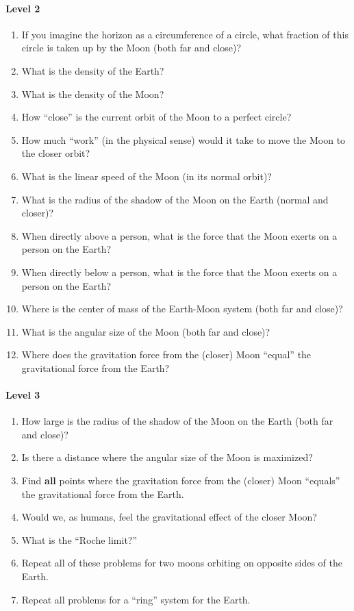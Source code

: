 \documentclass{ximera}
\begin{document}
\begin{problem}
\begin{freeResponse}
  \paragraph{Level 2}
  \begin{enumerate}
  \item If you imagine the horizon as a circumference of a circle, what
    fraction of this circle is taken up by the Moon (both far and
    close)?
  \item What is the density of the Earth?
  \item What is the density of the Moon?
  \item How ``close'' is the current orbit of the Moon to a perfect circle?
  \item How much ``work'' (in the physical sense) would it take to
    move the Moon to the closer orbit?
  \item What is the linear speed of the Moon (in its normal orbit)?
  \item What is the radius of the shadow of the Moon on the Earth
    (normal and closer)?
  \item When directly above a person, what is the force that the Moon
    exerts on a person on the Earth?
  \item When directly below a person, what is the force that the Moon
    exerts on a person on the Earth?
  \item Where is the center of mass of the Earth-Moon system (both far
    and close)?
  \item What is the angular size of the Moon (both far and close)?
  \item Where does the gravitation force from the (closer) Moon
    ``equal'' the gravitational force from the Earth?
  \end{enumerate}
  
  \paragraph{Level 3}
  \begin{enumerate}
  \item How large is the radius of the shadow of the Moon on the Earth
    (both far and close)?
  \item Is there a distance where the angular size of the Moon is maximized?
  \item Find \textbf{all} points where the gravitation force from the (closer)
    Moon ``equals'' the gravitational force from the Earth.
  \item Would we, as humans, feel the gravitational effect of the closer
    Moon?
  \item What is the ``Roche limit?''
  \item Repeat all of these problems for two moons orbiting on
    opposite sides of the Earth.
  \item Repeat all problems for a ``ring'' system for the Earth.
  \end{enumerate}
\end{freeResponse}
\end{problem}
\end{document}
